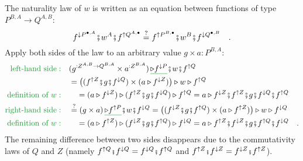 The naturality law of $w$ is written as an equation between functions
of type $P^{B,A}\rightarrow Q^{A,B}$:
\[
f^{\downarrow P^{\bullet,A}}\bef w^{A}\bef f^{\uparrow Q^{A,\bullet}}\overset{?}{=}f^{\uparrow P^{B,\bullet}}\bef w^{B}\bef f^{\downarrow Q^{\bullet,B}}\quad.
\]
Apply both sides of the law to an arbitrary value $g\times a:P^{B,A}$:
\begin{align*}
{\color{greenunder}\text{left-hand side}:}\quad & (g^{:Z^{A,B}\rightarrow Q^{B,A}}\times a^{:Z^{B,A}})\,\gunderline{\triangleright f^{\downarrow P}}\bef w\bef f^{\uparrow Q}\\
 & =\big((f^{\uparrow Z}\bef g\bef f^{\downarrow Q})\times(a\triangleright f^{\downarrow Z})\big)\triangleright w\triangleright f^{\uparrow Q}\\
{\color{greenunder}\text{definition of }w:}\quad & \quad=(a\triangleright f^{\downarrow Z})\triangleright(f^{\uparrow Z}\bef g\bef f^{\downarrow Q})\triangleright f^{\uparrow Q}=a\triangleright f^{\downarrow Z}\bef f^{\uparrow Z}\bef g\bef f^{\downarrow Q}\bef f^{\uparrow Q}\\
{\color{greenunder}\text{right-hand side}:}\quad & \overset{?}{=}(g\times a)\,\gunderline{\triangleright f^{\uparrow P}}\bef w\bef f^{\downarrow Q}=\big((f^{\downarrow Z}\bef g\bef f^{\uparrow Q})\times(a\triangleright f^{\uparrow Z})\big)\triangleright w\triangleright f^{\downarrow Q}\\
{\color{greenunder}\text{definition of }w:}\quad & \quad=(a\triangleright f^{\uparrow Z})\triangleright(f^{\downarrow Z}\bef g\bef f^{\uparrow Q})\triangleright f^{\downarrow Q}=a\triangleright f^{\uparrow Z}\bef f^{\downarrow Z}\bef g\bef f^{\uparrow Q}\bef f^{\downarrow Q}\quad.
\end{align*}
The remaining difference between two sides disappears due to the commutativity
laws of $Q$ and $Z$ (namely $f^{\uparrow Q}\bef f^{\downarrow Q}=f^{\downarrow Q}\bef f^{\uparrow Q}$
and $f^{\uparrow Z}\bef f^{\downarrow Z}=f^{\downarrow Z}\bef f^{\uparrow Z}$).


